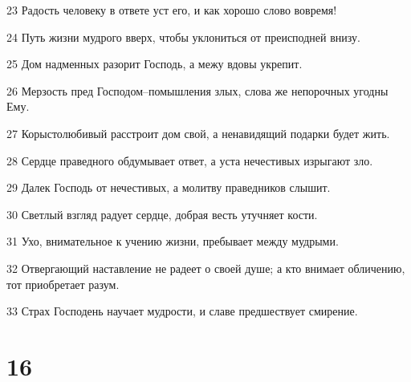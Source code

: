 \par 23 Радость человеку в ответе уст его, и как хорошо слово вовремя!
\par 24 Путь жизни мудрого вверх, чтобы уклониться от преисподней внизу.
\par 25 Дом надменных разорит Господь, а межу вдовы укрепит.
\par 26 Мерзость пред Господом--помышления злых, слова же непорочных угодны Ему.
\par 27 Корыстолюбивый расстроит дом свой, а ненавидящий подарки будет жить.
\par 28 Сердце праведного обдумывает ответ, а уста нечестивых изрыгают зло.
\par 29 Далек Господь от нечестивых, а молитву праведников слышит.
\par 30 Светлый взгляд радует сердце, добрая весть утучняет кости.
\par 31 Ухо, внимательное к учению жизни, пребывает между мудрыми.
\par 32 Отвергающий наставление не радеет о своей душе; а кто внимает обличению, тот приобретает разум.
\par 33 Страх Господень научает мудрости, и славе предшествует смирение.

\chapter{16}

